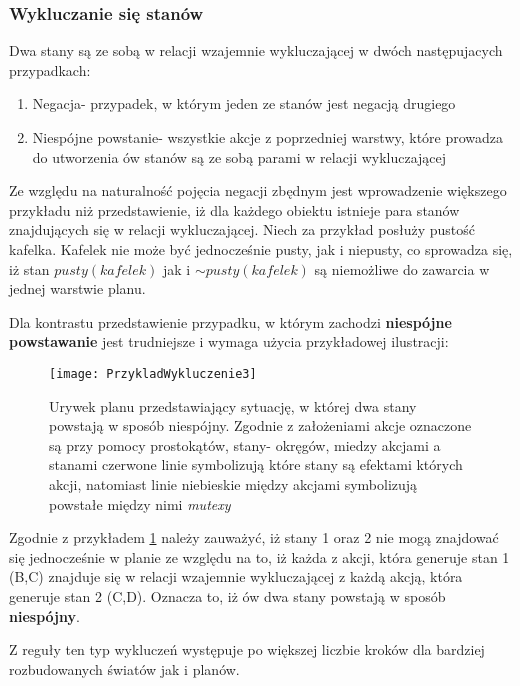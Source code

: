     \subsubsection{Wykluczanie się stanów}
    Dwa stany są ze sobą w relacji wzajemnie wykluczającej w dwóch następujacych przypadkach:
    \begin{enumerate}
        \item Negacja- przypadek, w którym jeden ze stanów jest negacją drugiego
        \item Niespójne powstanie- wszystkie akcje z poprzedniej warstwy, które prowadza 
        do utworzenia ów stanów są ze sobą parami w relacji wykluczającej
    \end{enumerate}
    Ze względu na naturalność pojęcia negacji zbędnym jest wprowadzenie większego przykładu niż przedstawienie, iż dla każdego obiektu istnieje 
    para stanów znajdujących się w relacji wykluczającej. Niech za przykład posłuży pustość kafelka. Kafelek nie może być jednocześnie pusty, jak 
    i niepusty, co sprowadza się, iż stan $pusty(kafelek)$ jak i $\sim pusty(kafelek)$ są niemożliwe do zawarcia w jednej warstwie planu.

    Dla kontrastu przedstawienie przypadku, w którym zachodzi \textbf{niespójne powstawanie} jest trudniejsze i wymaga użycia 
    przykładowej ilustracji:

    \begin{figure}[H]
        \texttt{[image: PrzykladWykluczenie3]}
        \centering
        \caption{Urywek planu przedstawiający sytuację, w której dwa stany powstają w sposób niespójny. Zgodnie z założeniami akcje oznaczone są przy 
        pomocy prostokątów, stany- okręgów, miedzy akcjami a stanami czerwone linie symbolizują które stany są efektami których akcji, natomiast linie
        niebieskie między akcjami symbolizują powstałe między nimi \textit{mutexy}}
        \label{PrzykladWykluczenie3}
    \end{figure}

    Zgodnie z przykładem \ref{PrzykladWykluczenie3} należy zauważyć, iż stany 1 oraz 2 nie mogą 
    znajdować się jednocześnie w planie ze względu na to, iż każda z akcji, która generuje stan 1 (B,C) znajduje się w relacji 
    wzajemnie wykluczającej z każdą akcją, która generuje stan 2 (C,D). Oznacza to, iż ów dwa stany powstają w sposób \textbf{niespójny}.
    
    Z reguły ten typ wykluczeń występuje po większej liczbie kroków dla bardziej rozbudowanych światów jak i planów.
    

